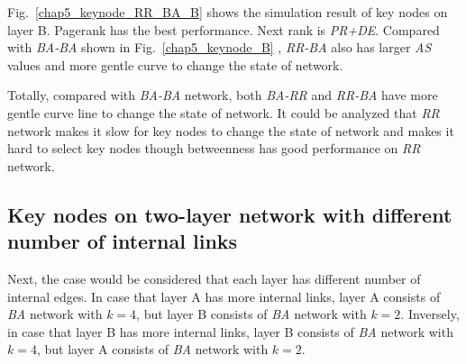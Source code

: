 Fig.~\ref{chap5_keynode_RR_BA_B} shows the simulation result of key nodes on layer B. Pagerank has the best performance. Next rank is \textit{PR+DE}.  Compared with \textit{BA-BA} shown in Fig.~\ref{chap5_keynode_B} , \textit{RR-BA} also has larger \textit{AS} values and more gentle curve to change the state of network. 

Totally, compared with \textit{BA-BA} network, both \textit{BA-RR} and \textit{RR-BA} have more gentle curve line to change the state of network. It could be analyzed that \textit{RR} network makes it slow for key nodes to change the state of network and makes it hard to select key nodes though betweenness has good performance on \textit{RR} network.\\  

\subsection{Key nodes on two-layer network with different number of internal links}
Next, the case would be considered that each layer has different number of internal edges. In case that layer A has more internal links, layer A consists of \textit{BA} network with $k=4$, but layer B consists of \textit{BA} network with $k=2$. Inversely, in case that layer B has more internal links, layer B consists of \textit{BA} network with $k=4$, but layer A consists of \textit{BA} network with $k=2$. 

